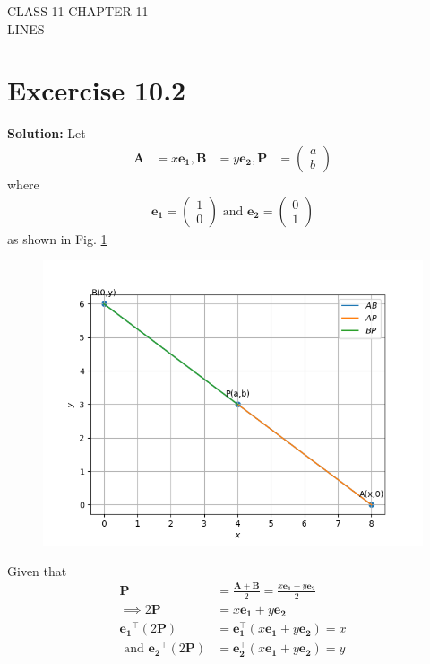 \documentclass[12pt]{article}
\providecommand{\brak}[1]{\ensuremath{\left(#1\right)}}
\newcommand{\solution}{\noindent \textbf{Solution: }}
\newcommand{\myvec}[1]{\ensuremath{\begin{pmatrix}#1\end{pmatrix}}}
\let\vec\mathbf
\begin{document}
\begin{center}
\textbf\large{CLASS 11 CHAPTER-11 \\ LINES}

\end{center}
\section*{Excercise 10.2}


\solution
\fi
Let
\begin{align}
	\vec{A}&=x\vec{e_{1}},
	\vec{B}&=y\vec{e_{2}},
	\vec{P}&=\myvec{a\\b}
\end{align}
where
\begin{align}
	\vec{e_{1}}=\myvec{1\\0} \text{ and } \vec{e_{2}}=\myvec{0\\1}
\end{align}
as shown in Fig. \ref{fig:11/10/2/18Fig1}
\begin{figure}[!h]
	\begin{center} 
	    \includegraphics[width=\columnwidth]{chapters/11/10/2/18/figs/line1}
	\end{center}
\caption{}
\label{fig:11/10/2/18Fig1}
\end{figure}
Given that
\begin{align}
	\vec{P}&=\frac{\vec{A}+\vec{B}}{2}=\frac{x\vec{e_{1}}+y\vec{e_{2}}}{2}\\
\implies 	2\vec{P}&=x\vec{e_{1}}+y\vec{e_{2}}\\
	\vec{e_{1}}^{\top}\brak{2\vec{P}}&=\vec{e_{1}^{\top}}\brak{x\vec{e_{1}}+y\vec{e_{2}}}
=x\\				 
	\text{ and }\vec{e_{2}}^{\top}\brak{2\vec{P}}&=\vec{e_{2}^{\top}}\brak{x\vec{e_{1}}+y\vec{e_{2}}}
=y				 
\end{align}
\end{document}
